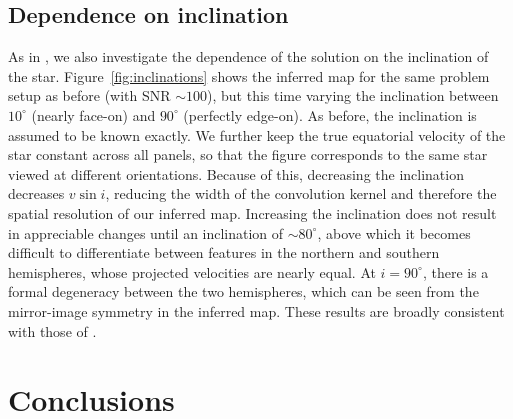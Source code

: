 \documentclass[modern]{aastex631}
\begin{document}
\subsection{Dependence on inclination}
\label{sec:inc}
%
%
As in \citet{Vogt1987}, we also investigate the dependence of the solution on the inclination of the star.
Figure~\ref{fig:inclinations} shows the inferred map for the same problem setup as before (with SNR $\sim 100$), but this time varying the inclination between $10^\circ$ (nearly face-on) and $90^\circ$ (perfectly edge-on). 
As before, the inclination is assumed to be known exactly. 
We further keep the true equatorial velocity of the star constant across all panels, so that the figure corresponds to the same star viewed at different orientations. 
Because of this, decreasing the inclination decreases $v\sin i$, reducing the width of the convolution kernel and therefore the spatial resolution of our inferred map. 
Increasing the inclination does not result in appreciable changes until an inclination of $\sim 80^\circ$, above which it becomes difficult to differentiate between features in the northern and southern hemispheres, whose projected velocities are nearly equal. 
At $i = 90^\circ$, there is a formal degeneracy between the two hemispheres, which can be seen from the mirror-image symmetry in the inferred map. 
These results are broadly consistent with those of \citet{Vogt1987}.

\section{Conclusions}
\label{sec:conclusions}
%
\end{document}
